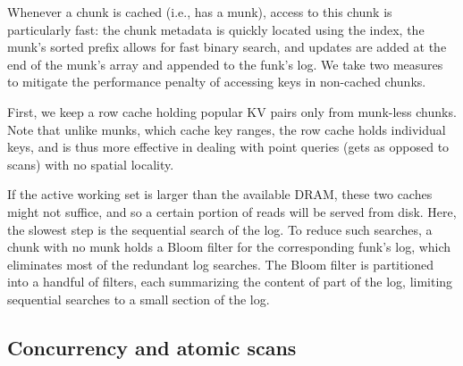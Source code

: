 Whenever a chunk is cached (i.e., has a munk), access to this chunk is particularly fast:
the chunk metadata is quickly located using the index, the munk's sorted prefix allows for fast 
binary search, and updates are added at the end of the munk's array and appended to the funk's log.
We take two measures to mitigate the performance penalty of accessing keys in non-cached chunks.

First, we keep a row cache holding popular KV pairs only from munk-less chunks. Note that unlike munks, which cache key ranges, the row
cache holds individual keys, and is thus more effective in dealing with point queries (gets as opposed to scans) with no
spatial locality.

If the active working set is larger than the available DRAM, these two caches might not suffice, and so a certain portion of reads 
will be served from disk. Here, the slowest step is the sequential search of the {log}. 
To reduce such searches, a chunk with no munk holds a Bloom filter for the corresponding funk's {log}, 
which eliminates most of the redundant log searches.
The Bloom filter is partitioned into a  handful of filters, each summarizing the 
content of part of the {log}, limiting  sequential  searches to a small section of the log.
 
 \subsection{Concurrency and atomic scans}
\label{ssec:scans}
 
